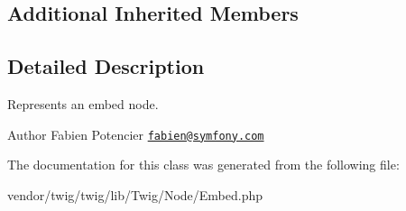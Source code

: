 \subsection*{Additional Inherited Members}


\subsection{Detailed Description}
Represents an embed node.

\begin{DoxyAuthor}{Author}
Fabien Potencier \href{mailto:fabien@symfony.com}{\tt fabien@symfony.\+com} 
\end{DoxyAuthor}


The documentation for this class was generated from the following file\+:\begin{DoxyCompactItemize}
\item 
vendor/twig/twig/lib/\+Twig/\+Node/Embed.\+php\end{DoxyCompactItemize}
